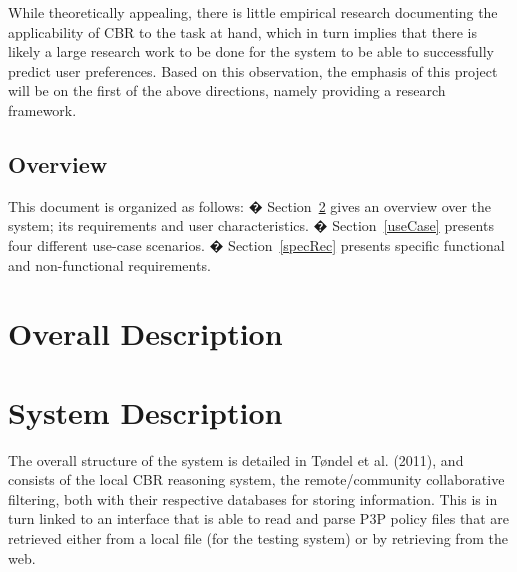 While theoretically appealing, there is little empirical research documenting the applicability of CBR to the task at hand, which in turn implies that there is likely a large research work to be done for the system to be able to successfully predict user preferences. Based on this observation, the emphasis of this project will be on the first of the above directions, namely providing a research framework.

\subsection{Overview}
This document is organized as follows:
�	Section~\ref{sysDesc} gives an overview over the system; its requirements and user characteristics.
�	Section~\ref{useCase} presents four different use-case scenarios.
�	Section~\ref{specRec} presents specific functional and non-functional requirements.
\section{Overall Description}

\section{System Description}\label{sysDesc}
The overall structure of the system is detailed in T{\o}ndel et al. (2011), and consists of the local CBR reasoning system, the remote/community collaborative filtering, both with their respective databases for storing information. This is in turn linked to an interface that is able to read and parse P3P policy files that are retrieved either from a local file (for the testing system) or by retrieving from the web.

